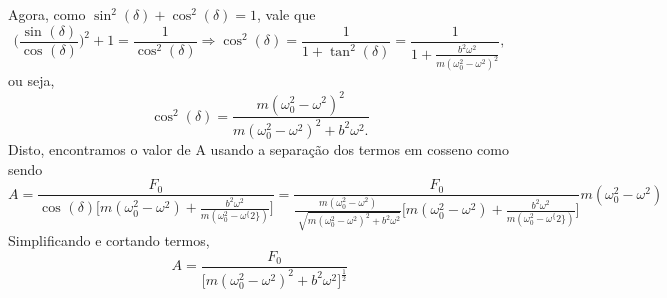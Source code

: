 \documentclass[PhysicsII/physicsII_notes.tex]{subfiles}
\begin{document}
Agora, como \(\sin^{2}{(\delta )} + \cos^{2}{(\delta )} = 1\), vale que
\[
	\biggl(\frac{\sin^{}{(\delta )}}{\cos^{}{(\delta )}}\biggr)^{2} + 1 = \frac{1}{\cos^{2}{(\delta )}} \Rightarrow \cos^{2}{(\delta )} = \frac{1}{1+\tan^{2}{(\delta )}} = \frac{1}{1+\frac{b^{2}\omega ^{2}}{m(\omega_{0}^{2}-\omega ^{2})^{2}}},
\]
ou seja,
\[
	\cos^{2}{(\delta )} = \frac{m(\omega_{0}^{2}-\omega ^{2})^{2}}{m(\omega_{0}^{2}-\omega ^{2})^{2}+b^{2}\omega ^{2}.}
\]
Disto, encontramos o valor de A usando a separação dos termos em cosseno como sendo
\[
	A = \frac{F_{0}}{\cos^{}{(\delta )}\biggl[m(\omega_{0}^{2}-\omega ^{2})+\frac{b^{2}\omega ^{2}}{m(\omega_{0}^{2}-\omega ^\{2\})}\biggr]} = \frac{F_{0}}{\frac{m(\omega_{0}^{2}-\omega ^{2})}{\sqrt[]{m(\omega_{0}^{2}-\omega ^{2})^{2}+b^{2}\omega ^{2}}}\biggl[m(\omega_{0}^{2}-\omega ^{2})+\frac{b^{2}\omega ^{2}}{m(\omega_{0}^{2}-\omega ^\{2\})}\biggr]}m(\omega_{0}^{2}-\omega ^{2})
\]
Simplificando e cortando termos,
\[
	A = \frac{F_{0}}{\biggl[m(\omega_{0}^{2}-\omega ^{2})^{2}+b^{2}\omega ^{2}\biggr]^{\frac{1}{2}}}
\]
\end{document}
